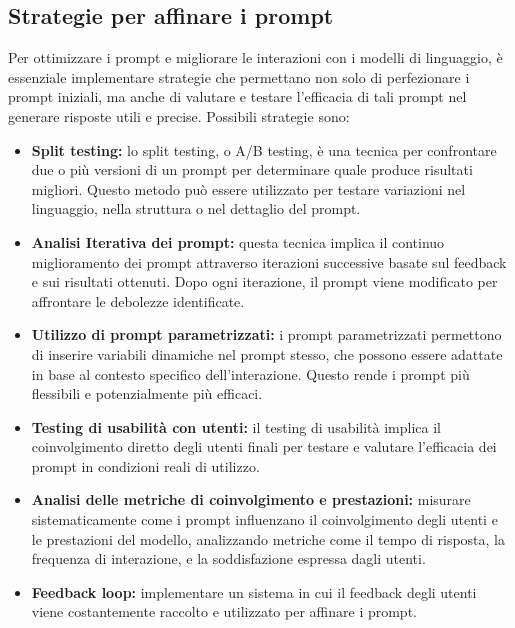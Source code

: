     \subsection{Strategie per affinare i prompt}
        Per ottimizzare i prompt e migliorare le interazioni con i modelli di linguaggio, è essenziale implementare strategie che permettano non solo di perfezionare i prompt iniziali, ma anche di valutare e testare l'efficacia di tali prompt nel generare risposte utili e precise. Possibili strategie sono:
        \begin{itemize}
            \item \textbf{Split testing:} lo split testing, o A/B testing, è una tecnica per confrontare due o più versioni di un prompt per determinare quale produce risultati migliori. Questo metodo può essere utilizzato per testare variazioni nel linguaggio, nella struttura o nel dettaglio del prompt.
            
            \item \textbf{Analisi Iterativa dei prompt:} questa tecnica implica il continuo miglioramento dei prompt attraverso iterazioni successive basate sul feedback e sui risultati ottenuti. Dopo ogni iterazione, il prompt viene modificato per affrontare le debolezze identificate.
            
            \item \textbf{Utilizzo di prompt parametrizzati:} i prompt parametrizzati permettono di inserire variabili dinamiche nel prompt stesso, che possono essere adattate in base al contesto specifico dell'interazione. Questo rende i prompt più flessibili e potenzialmente più efficaci.
            
            \item \textbf{Testing di usabilità con utenti:} il testing di usabilità implica il coinvolgimento diretto degli utenti finali per testare e valutare l'efficacia dei prompt in condizioni reali di utilizzo.
            
            \item \textbf{Analisi delle metriche di coinvolgimento e prestazioni:} misurare sistematicamente come i prompt influenzano il coinvolgimento degli utenti e le prestazioni del modello, analizzando metriche come il tempo di risposta, la frequenza di interazione, e la soddisfazione espressa dagli utenti.
            
            \item \textbf{Feedback loop:} implementare un sistema in cui il feedback degli utenti viene costantemente raccolto e utilizzato per affinare i prompt.
        \end{itemize}
        
